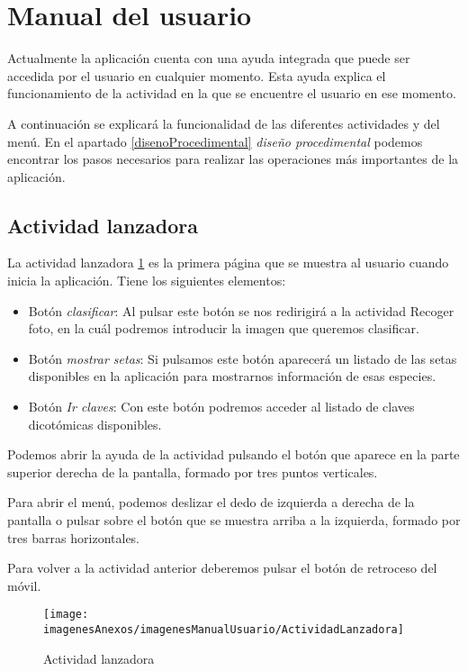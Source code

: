 \section{Manual del usuario}

Actualmente la aplicación cuenta con una ayuda integrada que puede ser accedida por el usuario en cualquier momento. Esta ayuda explica el funcionamiento de la actividad en la que se encuentre el usuario en ese momento.

A continuación se explicará la funcionalidad de las diferentes actividades y del menú. En el apartado \ref{disenoProcedimental} \textit{diseño procedimental} podemos encontrar los pasos necesarios para realizar las operaciones más importantes de la aplicación.

\subsection{Actividad lanzadora}

La actividad lanzadora \ref{figActividadLanzadora} es la primera página que se muestra al usuario cuando inicia la aplicación. Tiene los siguientes elementos:

\begin{itemize}
	\item Botón \textit{clasificar}: Al pulsar este botón se nos redirigirá a la actividad Recoger foto, en la cuál podremos introducir la imagen que queremos clasificar.
	\item Botón \textit{mostrar setas}: Si pulsamos este botón aparecerá un listado de las setas disponibles en la aplicación para mostrarnos información de esas especies.
	\item Botón \textit{Ir claves}: Con este botón podremos acceder al listado de claves dicotómicas disponibles.
\end{itemize}

Podemos abrir la ayuda de la actividad pulsando el botón que aparece en la parte superior derecha de la pantalla, formado por tres puntos verticales.

Para abrir el menú, podemos deslizar el dedo de izquierda a derecha de la pantalla o pulsar sobre el botón que se muestra arriba a la izquierda, formado por tres barras horizontales.

Para volver a la actividad anterior deberemos pulsar el botón de retroceso del móvil.

\begin{figure}[h]
    \begin{center}%
        \begin{center}%
          \texttt{[image: imagenesAnexos/imagenesManualUsuario/ActividadLanzadora]}%
          \caption{Actividad lanzadora}%
          \label{figActividadLanzadora}%
        \end{center}%
  	\end{center}%
\end{figure}%
\newpage


